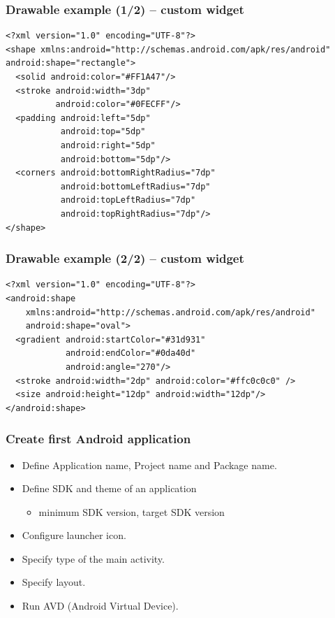\documentclass[10pt,xcolor=pdflatex]{beamer}
\begin{document}
\begin{frame}[fragile]\frametitle{Drawable example (1/2) -- custom widget}
	\lstset{language=XML, basicstyle=\footnotesize\ttfamily}
    \begin{lstlisting}
<?xml version="1.0" encoding="UTF-8"?> 
<shape xmlns:android="http://schemas.android.com/apk/res/android" android:shape="rectangle"> 
  <solid android:color="#FF1A47"/>    
  <stroke android:width="3dp"
          android:color="#0FECFF"/> 
  <padding android:left="5dp"
           android:top="5dp"
           android:right="5dp"
           android:bottom="5dp"/> 
  <corners android:bottomRightRadius="7dp"
           android:bottomLeftRadius="7dp" 
           android:topLeftRadius="7dp"
           android:topRightRadius="7dp"/> 
</shape>
    \end{lstlisting}
\end{frame}


\begin{frame}[fragile]\frametitle{Drawable example (2/2) -- custom widget}
	\lstset{language=XML, basicstyle=\footnotesize\ttfamily}
    \begin{lstlisting}
<?xml version="1.0" encoding="UTF-8"?> 
<android:shape 
    xmlns:android="http://schemas.android.com/apk/res/android" 
    android:shape="oval">
  <gradient android:startColor="#31d931" 
            android:endColor="#0da40d" 
            android:angle="270"/>
  <stroke android:width="2dp" android:color="#ffc0c0c0" />
  <size android:height="12dp" android:width="12dp"/>
</android:shape>
    \end{lstlisting}
\end{frame}


\begin{frame}\frametitle{Create first Android application}
	\begin{itemize}
		\item Define Application name, Project name and Package name.
		\item Define SDK and theme of an application
          \begin{itemize}
        	\item minimum SDK version, target SDK version
          \end{itemize}
		\item Configure launcher icon.
		\item Specify type of the main activity.
		\item Specify layout.
		\item Run AVD (Android Virtual Device).
	\end{itemize}
\end{frame}
\end{document}
